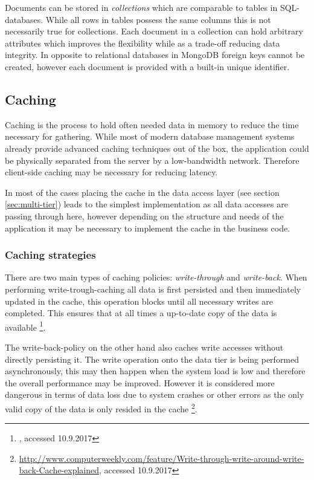 Documents can be stored in \emph{collections} which are comparable to tables in SQL-databases. While all rows in tables possess the same columns this is not necessarily true for collections. Each document in a collection can hold arbitrary attributes which improves the flexibility while as a trade-off reducing data integrity. In opposite to relational databases in MongoDB foreign keys cannot be created, however each document is provided with a built-in unique identifier.

\subsection{Caching}

Caching is the process to hold often needed data in memory to reduce the time necessary for gathering. While most of modern database management systems already provide advanced caching techniques out of the box, the application could be physically separated from the server by a low-bandwidth network. Therefore client-side caching may be necessary for reducing latency. 

In most of the cases placing the cache in the data access layer (see section \ref{sec:multi-tier}) leads to the simplest implementation as all data accesses are passing through here, however depending on the structure and needs of the application it may be necessary to implement the cache in the business code.

\subsubsection{Caching strategies}
There are two main types of caching policies: \emph{write-through} and \emph{write-back}. When performing write-trough-caching all data is first persisted and then immediately updated in the cache, this operation blocks until all necessary writes are completed. This ensures that at all times a up-to-date copy of the data is available \footnote{\href{http://searchsolidstatestorage.techtarget.com/answer/Comparing-write-through-write-back-and-write-around-caching}, accessed 10.9.2017}. 

The write-back-policy on the other hand also caches write accesses without directly persisting it. The write operation onto the data tier is being performed asynchronously, this may then happen when the system load is low and therefore the overall performance may be improved. However it is considered more dangerous in terms of data loss due to system crashes or other errors as the only valid copy of the data is only resided in the cache  \footnote{\href{http://www.computerweekly.com/feature/Write-through-write-around-write-back-Cache-explained}{http://www.computerweekly.com/feature/Write-through-write-around-write-back-Cache-explained}, accessed 10.9.2017}.


